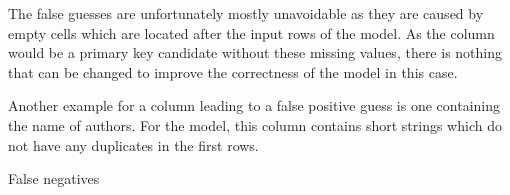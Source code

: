 The false guesses are unfortunately mostly unavoidable as they are caused by empty cells which are located after the input rows of the model. As the column would be a primary key candidate without these missing values, there is nothing that can be changed to improve the correctness of the model in this case.

Another example for a column leading to a false positive guess is one containing the name of authors. For the model, this column contains short strings which do not have any duplicates in the first rows. %

False negatives

